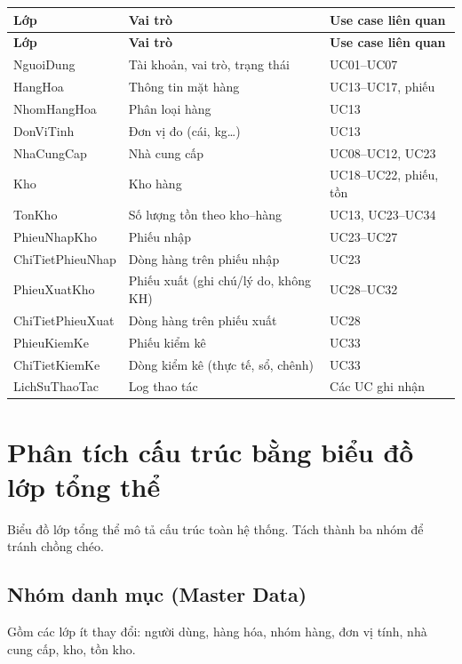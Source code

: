 \begin{longtable}{|p{3.5cm}|p{5cm}|p{4.5cm}|}
\hline
\textbf{Lớp} & \textbf{Vai trò} & \textbf{Use case liên quan} \\
\hline
\endfirsthead
\hline
\textbf{Lớp} & \textbf{Vai trò} & \textbf{Use case liên quan} \\
\hline
\endhead
NguoiDung & Tài khoản, vai trò, trạng thái & UC01--UC07 \\
\hline
HangHoa & Thông tin mặt hàng & UC13--UC17, phiếu \\
\hline
NhomHangHoa & Phân loại hàng & UC13 \\
\hline
DonViTinh & Đơn vị đo (cái, kg\ldots) & UC13 \\
\hline
NhaCungCap & Nhà cung cấp & UC08--UC12, UC23 \\
\hline
Kho & Kho hàng & UC18--UC22, phiếu, tồn \\
\hline
TonKho & Số lượng tồn theo kho--hàng & UC13, UC23--UC34 \\
\hline
PhieuNhapKho & Phiếu nhập & UC23--UC27 \\
\hline
ChiTietPhieuNhap & Dòng hàng trên phiếu nhập & UC23 \\
\hline
PhieuXuatKho & Phiếu xuất (ghi chú/lý do, không KH) & UC28--UC32 \\
\hline
ChiTietPhieuXuat & Dòng hàng trên phiếu xuất & UC28 \\
\hline
PhieuKiemKe & Phiếu kiểm kê & UC33 \\
\hline
ChiTietKiemKe & Dòng kiểm kê (thực tế, sổ, chênh) & UC33 \\
\hline
LichSuThaoTac & Log thao tác & Các UC ghi nhận \\
\hline
\end{longtable}

\section{Phân tích cấu trúc bằng biểu đồ lớp tổng thể}

Biểu đồ lớp tổng thể mô tả cấu trúc toàn hệ thống. Tách thành ba nhóm để tránh chồng chéo.

\subsection{Nhóm danh mục (Master Data)}

Gồm các lớp ít thay đổi: người dùng, hàng hóa, nhóm hàng, đơn vị tính, nhà cung cấp, kho, tồn kho.



